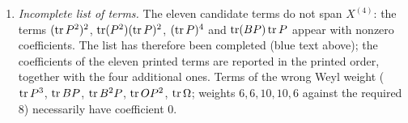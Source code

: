 {\begin{enumerate}
\item \emph{Incomplete list of terms.} The eleven candidate terms do not span $X^{(4)}$: the terms $(\operatorname{tr} P^2)^2$, $\operatorname{tr}(P^2)(\operatorname{tr} P)^2$, $(\operatorname{tr} P)^4$ and $\operatorname{tr}(BP)\operatorname{tr} P$ appear with nonzero coefficients. The list has therefore been completed (blue text above); the coefficients of the eleven printed terms are reported in the printed order, together with the four additional ones. Terms of the wrong Weyl weight ($\operatorname{tr} P^3$, $\operatorname{tr} BP$, $\operatorname{tr} B^2P$, $\operatorname{tr} OP^2$, $\operatorname{tr}\Omega$; weights $6,6,10,10,6$ against the required $8$) necessarily have coefficient $0$.
\end{enumerate}}